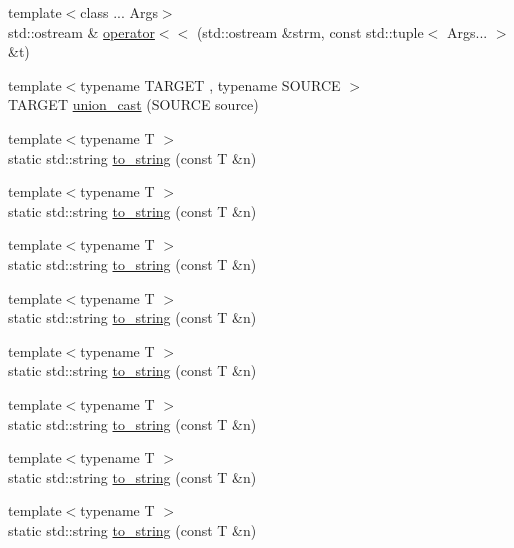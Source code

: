 \begin{DoxyCompactItemize}
{\footnotesize template$<$class ... Args$>$ }\\std\+::ostream \& \mbox{\hyperlink{namespacefakeit_a6042567070d19762ad715be75065d943}{operator$<$$<$}} (std\+::ostream \&strm, const std\+::tuple$<$ Args... $>$ \&t)
\item 
{\footnotesize template$<$typename T\+A\+R\+G\+ET , typename S\+O\+U\+R\+CE $>$ }\\T\+A\+R\+G\+ET \mbox{\hyperlink{namespacefakeit_a24ae70f25dee7b972fc9f92602994bc1}{union\+\_\+cast}} (S\+O\+U\+R\+CE source)
\item 
{\footnotesize template$<$typename T $>$ }\\static std\+::string \mbox{\hyperlink{namespacefakeit_a9004af88fd6282c85adc4aa7495b9cbe}{to\+\_\+string}} (const T \&n)
\item 
{\footnotesize template$<$typename T $>$ }\\static std\+::string \mbox{\hyperlink{namespacefakeit_a9004af88fd6282c85adc4aa7495b9cbe}{to\+\_\+string}} (const T \&n)
\item 
{\footnotesize template$<$typename T $>$ }\\static std\+::string \mbox{\hyperlink{namespacefakeit_a9004af88fd6282c85adc4aa7495b9cbe}{to\+\_\+string}} (const T \&n)
\item 
{\footnotesize template$<$typename T $>$ }\\static std\+::string \mbox{\hyperlink{namespacefakeit_a9004af88fd6282c85adc4aa7495b9cbe}{to\+\_\+string}} (const T \&n)
\item 
{\footnotesize template$<$typename T $>$ }\\static std\+::string \mbox{\hyperlink{namespacefakeit_a9004af88fd6282c85adc4aa7495b9cbe}{to\+\_\+string}} (const T \&n)
\item 
{\footnotesize template$<$typename T $>$ }\\static std\+::string \mbox{\hyperlink{namespacefakeit_a9004af88fd6282c85adc4aa7495b9cbe}{to\+\_\+string}} (const T \&n)
\item 
{\footnotesize template$<$typename T $>$ }\\static std\+::string \mbox{\hyperlink{namespacefakeit_a9004af88fd6282c85adc4aa7495b9cbe}{to\+\_\+string}} (const T \&n)
\item 
{\footnotesize template$<$typename T $>$ }\\static std\+::string \mbox{\hyperlink{namespacefakeit_a9004af88fd6282c85adc4aa7495b9cbe}{to\+\_\+string}} (const T \&n)
\end{DoxyCompactItemize}
